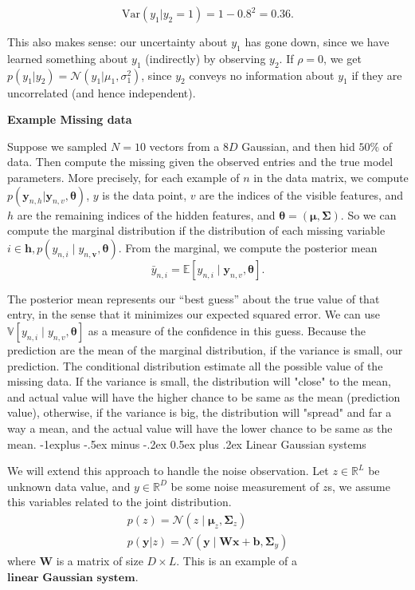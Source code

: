 \documentclass[10pt,landscape]{article}
\makeatletter
\newcommand{\N}{\mathcal{N}}
\newcommand{\var}{\mathbb{V}}
\newcommand{\inp}{\textbf{x}}
\newcommand{\out}{\textbf{y}}
\newcommand{\parameter}{\boldsymbol{\theta}}
\newcommand{\R}{\mathbb{R}}
\newcommand{\weight}{\mathbf{W}}
\newcommand{\Cov}{\mathbf{\Sigma}}
\newcommand{\Mean}{\boldsymbol{\mu}}
\newcommand{\bias}{\mathbf{b}}
\renewcommand{\subsection}{\@startsection{subsection}{2}{0mm}%
                                {-1explus -.5ex minus -.2ex}%
                                {0.5ex plus .2ex}%
                                {\normalfont\normalsize\bfseries}}
\makeatother
\begin{document}
\begin{multicols*}{3}
\[
\text{Var}(y_1 | y_2 = 1) = 1 - 0.8^2 = 0.36.
\]

This also makes sense: our uncertainty about \( y_1 \) has gone down, since we have learned something about \( y_1 \) (indirectly) by observing \( y_2 \). If \( \rho = 0 \), we get \( p(y_1 | y_2) = \mathcal{N}(y_1 | \mu_1, \sigma_1^2) \), since \( y_2 \) conveys no information about \( y_1 \) if they are uncorrelated (and hence independent).

\textbf{Example Missing data}

Suppose we sampled $N=10$ vectors from a $8D$ Gaussian, and then hid $50 \%$ of data. Then compute the missing given the observed entries and the true model parameters. More precisely, for each example of $n$ in the data matrix, we compute $p(\out_{n,h}|\out_{n,v},\parameter)$, $y$ is the data point, $v$ are the indices of the visible features, and $h$ are the remaining indices of the hidden features, and $\parameter=(\Mean,\Cov)$. So we can compute the marginal distribution if the distribution of each missing variable $i\in\mathbf{h},p(y_{n,i}\mid y_{n,\mathbf{v}},\parameter)$. From the marginal, we compute the  posterior mean
\[
    \bar{y}_{n,i} = \mathbb{E} \left[ y_{n,i} \mid \mathbf{y}_{n,v}, \boldsymbol{\theta} \right].
\]

The posterior mean represents our “best guess” about the true value of that entry, in the sense that it minimizes our expected squared error. We can use $\var[y_{n,i}\mid y_{n,v},\parameter]$ as a measure of the confidence in this guess. Because the prediction are the mean of the marginal distribution, if the variance is small, our prediction. The conditional distribution estimate all the possible value of the missing data. If the variance is small, the distribution will "close" to the mean, and actual value will have the higher chance to be same as the mean (prediction value), otherwise, if the variance is big, the distribution will "spread" and far a way a mean, and the actual value will have the lower chance to be same as the mean.
\subsection{Linear Gaussian systems}

We will extend this approach to handle the noise observation. Let $z\in\R^L$ be unknown data value, and $y\in\R^D$ be some noise measurement of $z$s, we assume this variables related to the joint distribution.
\begin{align*}
    p(z)=\N(z\mid\Mean_z,\Cov_z) \\
    p(\out|z)=\N(\out\mid\weight\inp+\bias,\Cov_y)
\end{align*}
where $\weight$ is a matrix of size $D\times L$. This is an example of a $\textbf{linear Gaussian system}$.


\end{multicols*}
\end{document}
